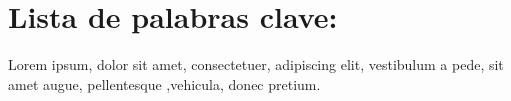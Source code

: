 %
%

\section*{Lista de palabras clave:}

Lorem ipsum, dolor sit amet, consectetuer, adipiscing elit, vestibulum a pede, sit amet augue, pellentesque ,vehicula, donec pretium.


